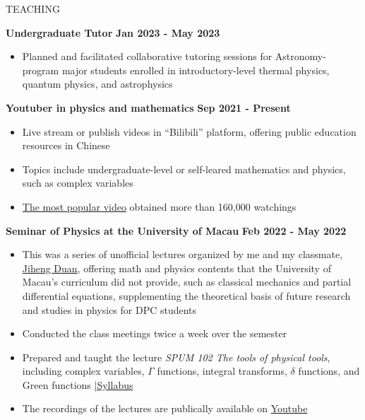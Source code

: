 \documentclass[10pt]{article} %
\begin{document}
\begin{section}{TEACHING}

\textbf{Undergraduate Tutor} \hfill \textbf{Jan 2023 - May 2023}
\begin{itemize}[leftmargin=1.5em]
    \item Planned and facilitated collaborative tutoring sessions for Astronomy-program major students enrolled in introductory-level thermal physics, quantum physics, and astrophysics
\end{itemize}

\textbf{Youtuber in physics and mathematics} \hfill \textbf{Sep 2021 - Present}
\begin{itemize}[leftmargin=1.5em]
    \item Live stream or publish videos in ``Bilibili'' platform, offering public education resources in Chinese
    \item Topics include undergraduate-level or self-leared mathematics and physics, such as complex variables
    \item \href{https://www.bilibili.com/video/BV1th411W7xu/}{The most popular video} obtained more than 160,000 watchings
\end{itemize}

\textbf{Seminar of Physics at the University of Macau} \hfill \textbf{Feb 2022 - May 2022}
\begin{itemize}[leftmargin=1.5em]
    \item This was a series of unofficial lectures organized by me and my classmate, \href{http://runawayfancy.me/}{Jiheng Duan}, offering math and physics contents that the University of Macau's curriculum did not provide, such as classical mechanics and partial differential equations, supplementing the theoretical basis of future research and studies in physics for DPC students 
    \item Conducted the class meetings twice a week over the semester
    \item Prepared and taught the lecture \textit{SPUM 102 The tools of physical tools}, including complex variables, $\Gamma$ functions, integral transforms, $\delta$ functions, and Green functions \hfill {\footnotesize \href{https://github.com/Chisen-Lupus/Seminar-of-Physics-UM/blob/main/SPUM%20102%20The%20tools%20of%20physical%20tool.pdf}{|Syllabus}}
    \item The recordings of the lectures are publically available on \href{https://www.youtube.com/watch?v=nQkv03r-XeQ&list=PLV9fHDZW7hHWQ9rrAk7c9kdeV-Lqyt7pV&index=10}{Youtube}
\end{itemize}

\end{section}
\end{document}

